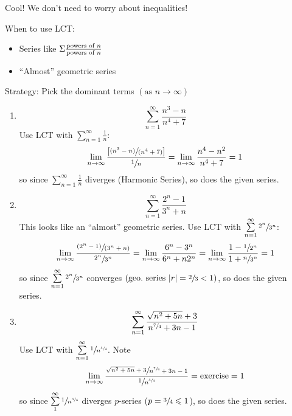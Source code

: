 Cool! We don't need to worry about inequalities!

\begin{Remark}{}{}
    When to use LCT\@:
    \begin{itemize}
        \item Series like $ \Sigma \frac{\text{powers of $ n $}}{\text{powers of $ n $}} $
        \item ``Almost'' geometric series
    \end{itemize}
    Strategy: Pick the dominant terms $ \left( \text{as } n\rightarrow \infty \right) $
\end{Remark}

\begin{Example}{}{}
    \begin{enumerate}
        \item \[ \sum\limits_{n=1}^{\infty} \frac{n^3-n}{n^4+7}  \]
              Use LCT with $ \sum\limits_{n=1}^{\infty} \frac{1}{n} $:
              \[ \lim\limits_{{n} \to {\infty}} \frac{\left[ \sfrac{(n^3-n)}{(n^4+7)} \right]}{\sfrac{1}{n}}
                  =\lim\limits_{{n} \to {\infty}} \frac{n^4-n^2}{n^4+7}
                  =1 \]
              so since $ \sum\limits_{n=1}^{\infty} \frac{1}{n}  $ diverges (Harmonic Series),
              so does the given series.
        \item \[ \sum\limits_{n=1}^{\infty} \frac{2^n-1}{3^n+n} \]
              This looks like an ``almost'' geometric series. Use LCT with $ \sum\limits_{n=1}^{\infty}
                  \sfrac{2^n}{3^n} $:
              \[ \lim\limits_{{n} \to {\infty}}\frac{\sfrac{(2^n-1)}{(3^n+n)}}{\sfrac{2^n}{3^n}}
                  =\lim\limits_{{n} \to {\infty}} \frac{6^n-3^n}{6^n+n2^n}=
                  \lim\limits_{{n} \to {\infty}} \frac{1-\sfrac{1}{2^n}}{1+\sfrac{n}{3^n}}
                  =1 \]
              so since $ \sum\limits_{n=1}^{\infty} \sfrac{2^n}{3^n} $ converges
              $ (\text{geo.\ series } \lvert r\rvert=\sfrac{2}{3} <1) $, so does
              the given series.
        \item \[ \sum\limits_{n=1}^{\infty} \frac{\sqrt{n^2+5n}+3}{n^{\sfrac{7}{4}}+3n-1} \]
              Use LCT with $ \sum\limits_{n=1}^{\infty} \sfrac{1}{n^{\sfrac{3}{4}}} $. Note
              \[ \lim\limits_{{n} \to {\infty}}
                  \frac{\sfrac{\sqrt{n^2+5n}+3}{n^{\sfrac{7}{4}}+3n-1}}{\sfrac{1}{n^{\sfrac{3}{4}}}}
                  =\text{exercise}=1  \]
              so since $ \sum\limits_{1}^{\infty} \sfrac{1}{n^{\sfrac{3}{4}}}  $ diverges
              $ p $-series ($ p=\sfrac{3}{4}\leqslant 1 $), so does the given series.
    \end{enumerate}
\end{Example}

